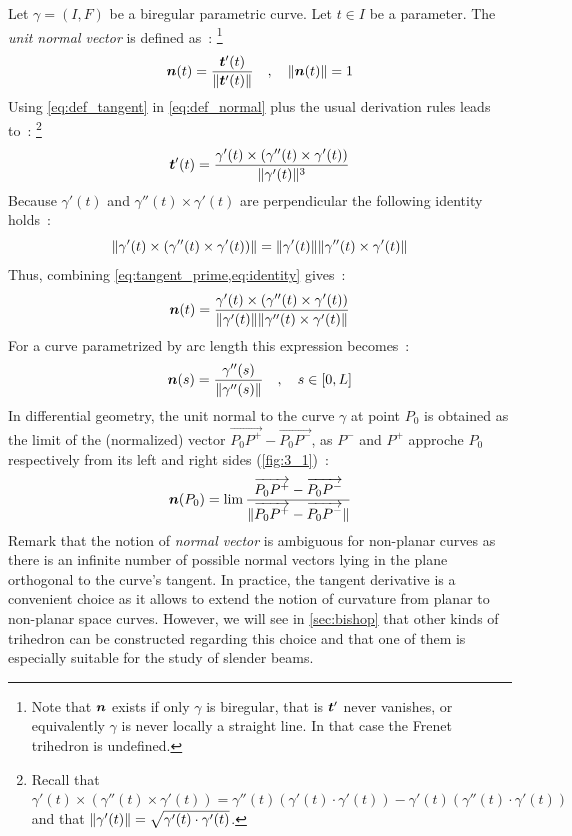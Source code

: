 Let $\gamma = (I,F)$ be a biregular parametric curve. Let $t \in I$ be a parameter. The \emph{unit normal vector} is defined as~: \footnote{Note that $\boldsymbol{n}$ exists if only $\gamma$ is biregular, that is $\boldsymbol{t}'$ never vanishes, or equivalently $\gamma$ is never locally a straight line. In that case the Frenet trihedron is undefined.}
\begin{equation}
	\boldsymbol{n}(t) = \frac{\boldsymbol{t}'(t)}{\lVert\boldsymbol{t}'(t)\rVert} 
	\quad,\quad
	\lVert\boldsymbol{n}(t)\rVert=1
	\label{eq:def_normal}
\end{equation}
Using \cref{eq:def_tangent} in \cref{eq:def_normal} plus the usual derivation rules leads to~: \footnote{Recall that $\gamma'(t) \times (\gamma''(t) \times \gamma'(t)) = \gamma''(t) (\gamma'(t) \cdot \gamma'(t)) - \gamma'(t) (\gamma''(t) \cdot \gamma'(t))$ and that $\lVert\gamma'(t)\rVert = \sqrt{\gamma'(t) \cdot \gamma'(t)}$.}
\begin{equation}
	\boldsymbol{t}'(t) = \frac{\gamma'(t) \times (\gamma''(t) \times \gamma'(t))}{\lVert\gamma'(t)\rVert^3}
	\label{eq:tangent_prime}
\end{equation}
Because $\gamma'(t)$ and $\gamma''(t) \times \gamma'(t)$ are perpendicular the following identity holds~:
\begin{equation}
	\lVert\gamma'(t) \times (\gamma''(t) \times \gamma'(t))\rVert = \lVert\gamma'(t)\rVert\lVert\gamma''(t) \times \gamma'(t)\rVert
	\label{eq:identity}
\end{equation}
Thus, combining \cref{eq:tangent_prime,eq:identity} gives~:
\begin{equation}
	\boldsymbol{n}(t) = \frac{\gamma'(t) \times (\gamma''(t) \times \gamma'(t))}{\lVert\gamma'(t)\rVert\lVert\gamma''(t) \times \gamma'(t)\rVert}
	\label{eq:def2_normal}
\end{equation}
For a curve parametrized by arc length this expression becomes~:
\begin{equation}
	\boldsymbol{n}(s) =  \frac{\gamma''(s)}{\lVert\gamma''(s)\rVert}
	\quad,\quad
	s \in [0,L]
\end{equation}
In differential geometry, the unit normal to the curve $\gamma$ at point $P_0$ is obtained as the limit of the (normalized) vector $\overrightarrow{P_0 P^+}-\overrightarrow{P_0 P^-}$, as $P^-$ and $P^+$ approche $P_0$ respectively from its left and right sides (\cref{fig:3_1})~:
\begin{equation}
	\boldsymbol{n}(P_0)
	= \lim_{}\frac{\overrightarrow{P_0 P^+}-\overrightarrow{P_0 P^-}}{\lVert\overrightarrow{P_0 P^+}-\overrightarrow{P_0 P^-}\rVert}
\label{eq:3_4}
\end{equation}
Remark that the notion of \emph{normal vector} is ambiguous for non-planar curves as there is an infinite number of possible normal vectors lying in the plane orthogonal to the curve's tangent. In practice, the tangent derivative is a convenient choice as it allows to extend the notion of curvature from planar to non-planar space curves. However, we will see in \cref{sec:bishop} that other kinds of trihedron can be constructed regarding this choice and that one of them is especially suitable for the study of slender beams.

